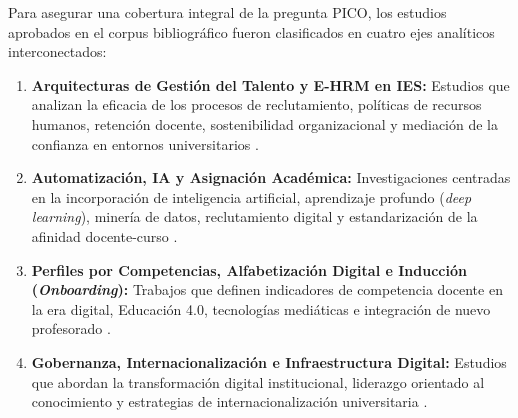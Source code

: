 \documentclass[conference]{IEEEtran}
\begin{document}
Para asegurar una cobertura integral de la pregunta PICO, los estudios aprobados en el corpus bibliográfico fueron clasificados en cuatro ejes analíticos interconectados:
\begin{enumerate}
    \item \textbf{Arquitecturas de Gestión del Talento y E-HRM en IES:} Estudios que analizan la eficacia de los procesos de reclutamiento, políticas de recursos humanos, retención docente, sostenibilidad organizacional y mediación de la confianza en entornos universitarios \cite{shrivastava2022_0, vezou2026_18, sadagheyani2021_26, li2025_28, bj2022_34, abbas2022_42, zongyu2024_57, mahade2025_58, musakuro2022_71, liechti2026_72, hussein2024_77, sadeghian2021_80, ebrahim2025_81}.
    \item \textbf{Automatización, IA y Asignación Académica:} Investigaciones centradas en la incorporación de inteligencia artificial, aprendizaje profundo (\textit{deep learning}), minería de datos, reclutamiento digital y estandarización de la afinidad docente-curso \cite{fan2025_8, michael2024_22, zhou2023_31, coronel2024_39, nain2026_47, johar2024_65}.
    \item \textbf{Perfiles por Competencias, Alfabetización Digital e Inducción (\textit{Onboarding}):} Trabajos que definen indicadores de competencia docente en la era digital, Educación 4.0, tecnologías mediáticas e integración de nuevo profesorado \cite{gorbatkova2023_15, ji2025_17, dejene2022_23, ram2021_27, vedhathiri2021_37}.
    \item \textbf{Gobernanza, Internacionalización e Infraestructura Digital:} Estudios que abordan la transformación digital institucional, liderazgo orientado al conocimiento y estrategias de internacionalización universitaria \cite{mahsusi2024_29, ononye2024_43, soquiat2026_52, fahmy2025_56}.
\end{enumerate}



\end{document}
